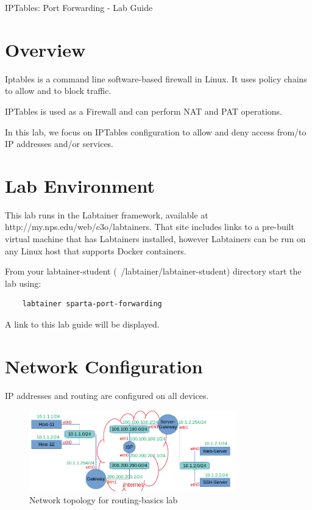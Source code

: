 


\begin{center}
{\LARGE IPTables: Port Forwarding - Lab Guide}
\vspace{0.1in}\\
\end{center}

\copyrightnotice

\section{Overview}
Iptables is a command line software-based firewall in Linux. It uses policy chains to allow and to block traffic.

IPTables is used as a Firewall and can perform NAT and PAT operations.

In this lab, we focus on IPTables configuration to allow and deny access from/to IP addresses and/or services.

\section{Lab Environment}
This lab runs in the Labtainer framework,
available at http://my.nps.edu/web/c3o/labtainers.
That site includes links to a pre-built virtual machine
that has Labtainers installed, however Labtainers can
be run on any Linux host that supports Docker containers.

From your labtainer-student (~/labtainer/labtainer-student) directory start the lab using:
\begin{verbatim}
    labtainer sparta-port-forwarding
\end{verbatim}
\noindent A link to this lab guide will be displayed.

\section{Network Configuration}
IP addresses and routing are configured on all devices.

\begin{figure}[H]
\begin{center}
\includegraphics [width=0.8\textwidth]{labtainers-port-forwarding-lab-01.png}
\end{center}
\caption{Network topology for routing-basics lab}
\label{fig:topology}
\end{figure}

